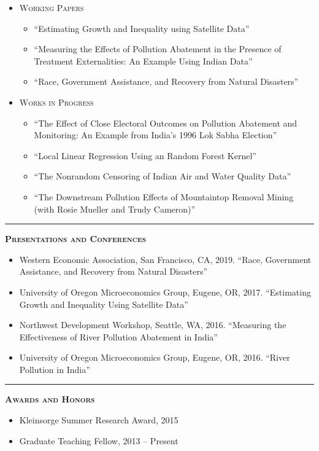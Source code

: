 \documentclass[12pt]{article}
\begin{document}
\begin{itemize}
\item[] \textsc{Working Papers}
\begin{itemize}[]
\item[] ``Estimating Growth and Inequality using Satellite Data''
\item[] ``Measuring the Effects of Pollution Abatement in the Presence of Treatment \mbox{Externalities:} An Example Using Indian Data''
\item[] ``Race, Government Assistance, and Recovery from Natural Disasters''  
\end{itemize}

\item[] \textsc{Works in Progress}
  \begin{itemize}[]
\item[] ``The Effect of Close Electoral Outcomes on Pollution Abatement and Monitoring: An Example from India's 1996 Lok Sabha Election''    
\item[] ``Local Linear Regression Using an Random Forest Kernel''
\item[] ``The Nonrandom Censoring of Indian Air and Water Quality Data''
\item[] ``The Downstream Pollution Effects of Mountaintop Removal Mining (with Rosie Mueller and Trudy Cameron)''
\end{itemize}
\end{itemize}

\bigskip
\hrule
\bigskip 
\noindent \textsc{\large \textbf{Presentations and Conferences}}

\begin{itemize}
\item[] Western Economic Association, San Francisco, CA, 2019. ``Race, Government Assistance, and Recovery from Natural Disasters''  
\item[] University of Oregon Microeconomics Group, Eugene, OR, 2017. ``Estimating Growth and Inequality Using Satellite Data''
\item[] Northwest Development Workshop, Seattle, WA, 2016. ``Measuring the Effectiveness of River Pollution Abatement in India''
\item[] University of Oregon Microeconomics Group, Eugene, OR, 2016. ``River Pollution in India''
\end{itemize}

\bigskip
\hrule
\bigskip 
\noindent \textsc{\large \textbf{Awards and Honors}}

\begin{itemize}
\item[] Kleinsorge Summer Research Award, 2015
\item[] Graduate Teaching Fellow, 2013 -- Present
\end{itemize}
\end{document}

